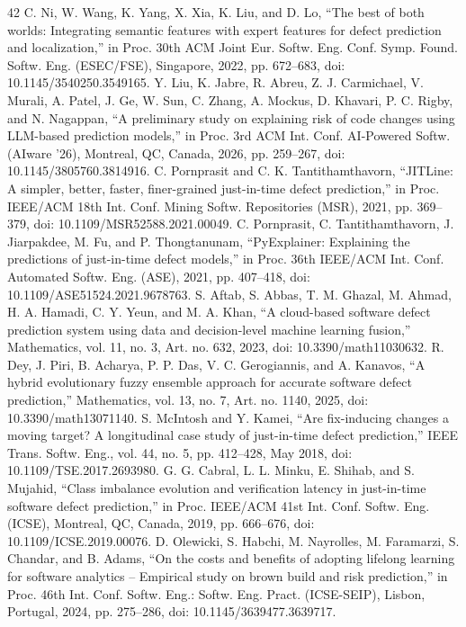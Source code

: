 \begin{thebibliography}{42}
 C. Ni, W. Wang, K. Yang, X. Xia, K. Liu, and D. Lo, ``The best of both worlds: Integrating semantic features with expert features for defect prediction and localization,'' in Proc. 30th ACM Joint Eur. Softw. Eng. Conf. Symp. Found. Softw. Eng. (ESEC/FSE), Singapore, 2022, pp. 672--683, doi: \mbox{10.1145/3540250.3549165}.
 Y. Liu, K. Jabre, R. Abreu, Z. J. Carmichael, V. Murali, A. Patel, J. Ge, W. Sun, C. Zhang, A. Mockus, D. Khavari, P. C. Rigby, and N. Nagappan, ``A preliminary study on explaining risk of code changes using LLM-based prediction models,'' in Proc. 3rd ACM Int. Conf. AI-Powered Softw. (AIware '26), Montreal, QC, Canada, 2026, pp. 259--267, doi: \mbox{10.1145/3805760.3814916}.
 C. Pornprasit and C. K. Tantithamthavorn, ``JITLine: A simpler, better, faster, finer-grained just-in-time defect prediction,'' in Proc. IEEE/ACM 18th Int. Conf. Mining Softw. Repositories (MSR), 2021, pp. 369--379, doi: \mbox{10.1109/MSR52588.2021.00049}.
 C. Pornprasit, C. Tantithamthavorn, J. Jiarpakdee, M. Fu, and P. Thongtanunam, ``PyExplainer: Explaining the predictions of just-in-time defect models,'' in Proc. 36th IEEE/ACM Int. Conf. Automated Softw. Eng. (ASE), 2021, pp. 407--418, doi: \mbox{10.1109/ASE51524.2021.9678763}.
 S. Aftab, S. Abbas, T. M. Ghazal, M. Ahmad, H. A. Hamadi, C. Y. Yeun, and M. A. Khan, ``A cloud-based software defect prediction system using data and decision-level machine learning fusion,'' Mathematics, vol. 11, no. 3, Art. no. 632, 2023, doi: \mbox{10.3390/math11030632}.
 R. Dey, J. Piri, B. Acharya, P. P. Das, V. C. Gerogiannis, and A. Kanavos, ``A hybrid evolutionary fuzzy ensemble approach for accurate software defect prediction,'' Mathematics, vol. 13, no. 7, Art. no. 1140, 2025, doi: \mbox{10.3390/math13071140}.
 S. McIntosh and Y. Kamei, ``Are fix-inducing changes a moving target? A longitudinal case study of just-in-time defect prediction,'' IEEE Trans. Softw. Eng., vol. 44, no. 5, pp. 412--428, May 2018, doi: \mbox{10.1109/TSE.2017.2693980}.
 G. G. Cabral, L. L. Minku, E. Shihab, and S. Mujahid, ``Class imbalance evolution and verification latency in just-in-time software defect prediction,'' in Proc. IEEE/ACM 41st Int. Conf. Softw. Eng. (ICSE), Montreal, QC, Canada, 2019, pp. 666--676, doi: \mbox{10.1109/ICSE.2019.00076}.
 D. Olewicki, S. Habchi, M. Nayrolles, M. Faramarzi, S. Chandar, and B. Adams, ``On the costs and benefits of adopting lifelong learning for software analytics -- Empirical study on brown build and risk prediction,'' in Proc. 46th Int. Conf. Softw. Eng.: Softw. Eng. Pract. (ICSE-SEIP), Lisbon, Portugal, 2024, pp. 275--286, doi: \mbox{10.1145/3639477.3639717}.

\end{thebibliography}
